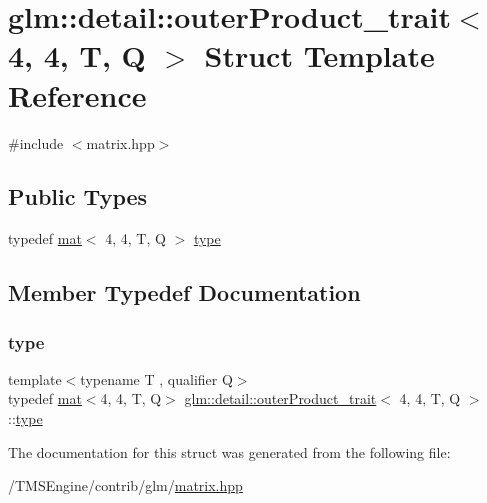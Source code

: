 \hypertarget{structglm_1_1detail_1_1outer_product__trait_3_014_00_014_00_01_t_00_01_q_01_4}{}\section{glm\+:\+:detail\+:\+:outer\+Product\+\_\+trait$<$ 4, 4, T, Q $>$ Struct Template Reference}
\label{structglm_1_1detail_1_1outer_product__trait_3_014_00_014_00_01_t_00_01_q_01_4}


{\ttfamily \#include $<$matrix.\+hpp$>$}

\subsection*{Public Types}
\begin{DoxyCompactItemize}
\item 
typedef \hyperlink{structglm_1_1mat}{mat}$<$ 4, 4, T, Q $>$ \hyperlink{structglm_1_1detail_1_1outer_product__trait_3_014_00_014_00_01_t_00_01_q_01_4_a8406d33a053d454b8546830f1d2ad668}{type}
\end{DoxyCompactItemize}


\subsection{Member Typedef Documentation}
\mbox{\label{structglm_1_1detail_1_1outer_product__trait_3_014_00_014_00_01_t_00_01_q_01_4_a8406d33a053d454b8546830f1d2ad668}} 
\subsubsection{\texorpdfstring{type}{type}}
{\footnotesize\ttfamily template$<$typename T , qualifier Q$>$ \\
typedef \hyperlink{structglm_1_1mat}{mat}$<$4, 4, T, Q$>$ \hyperlink{structglm_1_1detail_1_1outer_product__trait}{glm\+::detail\+::outer\+Product\+\_\+trait}$<$ 4, 4, T, Q $>$\+::\hyperlink{structglm_1_1detail_1_1outer_product__trait_3_014_00_014_00_01_t_00_01_q_01_4_a8406d33a053d454b8546830f1d2ad668}{type}}



The documentation for this struct was generated from the following file\+:\begin{DoxyCompactItemize}
\item 
/\+T\+M\+S\+Engine/contrib/glm/\hyperlink{matrix_8hpp}{matrix.\+hpp}\end{DoxyCompactItemize}
